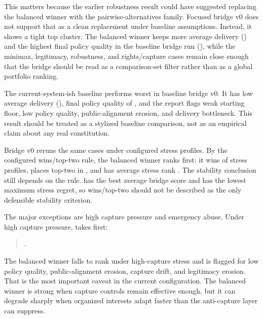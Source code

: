 \documentclass[11pt]{article}
\providecommand{\GeneratedDir}{generated}
\begin{document}
This matters because the earlier robustness result could have suggested replacing the balanced winner with the pairwise-alternatives family. Focused bridge v0 does not support that as a clean replacement under baseline assumptions. Instead, it shows a tight top cluster. The balanced winner keeps more average delivery (\BalancedBridgeAverageDelivery) and the highest final policy quality in the baseline bridge run (\BalancedBridgeFinalPolicyQuality), while the minimax, legitimacy, robustness, and rights/capture cases remain close enough that the bridge should be read as a comparison-set filter rather than as a global portfolio ranking.

The current-system-ish baseline performs worst in baseline bridge v0. It has low average delivery (\CurrentBaselineAverageDelivery), final policy quality of \CurrentBaselineFinalPolicyQuality, and the report flags weak starting floor, low policy quality, public-alignment erosion, and delivery bottleneck. This result should be treated as a stylized baseline comparison, not as an empirical claim about any real constitution.

Bridge v0 reruns the same \BridgeCaseCount{} cases under \StressProfileCount{} configured stress profiles. By the configured wins/top-two rule, the balanced winner ranks first: it wins \BalancedStressWins{} of \StressProfileCount{} stress profiles, places top-two in \BalancedStressTopTwo, and has average stress rank \BalancedAverageStressRank. The stability conclusion still depends on the rule. \AverageScoreStressWinnerName{} has the best average bridge score and \MinimaxStressRegretWinnerName{} has the lowest maximum stress regret, so wins/top-two should not be described as the only defensible stability criterion.



The major exceptions are high capture pressure and emergency abuse. Under high capture pressure, \HighCaptureWinnerName{} takes first:

\begin{quote}
\HighCaptureWinnerPortfolio.
\end{quote}

The balanced winner falls to rank \BalancedHighCaptureRank{} under high-capture stress and is flagged for low policy quality, public-alignment erosion, capture drift, and legitimacy erosion. That is the most important caveat in the current configuration. The balanced winner is strong when capture controls remain effective enough, but it can degrade sharply when organized interests adapt faster than the anti-capture layer can suppress.
\end{document}
